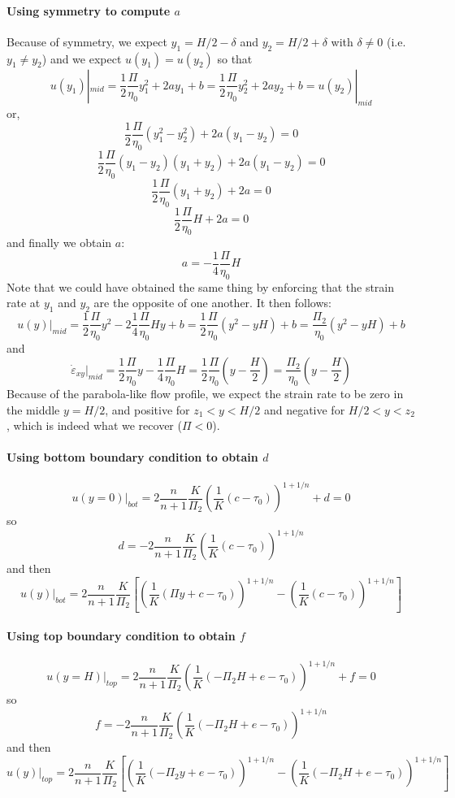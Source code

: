 \paragraph{Using symmetry to compute $a$}
Because of symmetry, we expect $y_1=H/2-\delta$ and $y_2=H/2+\delta$ with $\delta \neq 0$ 
(i.e. $y_1\neq y_2$) and we expect $u(y_1)=u(y_2)$ so that 
\[
u(y_1)|_{mid}=
\frac{1}{2}\frac{\Pi}{\eta_0} y_1^2 + 2a y_1 + b
=
\frac{1}{2}\frac{\Pi}{\eta_0} y_2^2 + 2a y_2 + b=
u(y_2)|_{mid}
\]
or, 
\[
\frac{1}{2}\frac{\Pi}{\eta_0} (y_1^2-y_2^2) + 2a (y_1-y_2) =0
\]
\[
\frac{1}{2}\frac{\Pi}{\eta_0} (y_1-y_2)(y_1+y_2) + 2a (y_1-y_2) =0
\]
\[
\frac{1}{2}\frac{\Pi}{\eta_0} (y_1+y_2) + 2a =0
\]
\[
\frac{1}{2}\frac{\Pi}{\eta_0} H + 2a =0
\]
and finally we obtain $a$:
\[
\boxed{
a = -\frac{1}{4} \frac{\Pi}{\eta_0} H
}
\]
Note that we could have obtained the same thing by enforcing that the strain rate 
at $y_1$ and $y_2$ are the opposite of one another. It then follows: 
\[
\boxed{
u(y)|_{mid} 
= \frac{1}{2}\frac{\Pi}{\eta_0} y^2  -2\frac{1}{4} \frac{\Pi}{\eta_0} H y + b
= \frac{1}{2}\frac{\Pi}{\eta_0} (y^2  -  y H) + b
= \frac{\Pi_2}{\eta_0} (y^2  -  y H) + b
}
\]
and 
\[
\boxed{
\dot{\varepsilon}_{xy}|_{mid}
= \frac{1}{2} \frac{\Pi}{\eta_0}y  -\frac{1}{4} \frac{\Pi}{\eta_0} H
= \frac{1}{2} \frac{\Pi}{\eta_0} (y  -\frac{H}{2} )
=  \frac{\Pi_2}{\eta_0} (y  -\frac{H}{2} )
}
\]
Because of the parabola-like flow profile, we expect the strain rate 
to be zero in the middle $y=H/2$, and positive for $z_1<y<H/2$ and 
negative for $H/2<y<z_2$, which is indeed what we recover ($\Pi<0$).

\paragraph{Using bottom boundary condition to obtain $d$}
\[
u(y=0)|_{bot} = 2 \frac{n}{n+1} \frac{K}{\Pi_2} \left( \frac{1}{K} ( c -\tau_0 ) \right)^{1+1/n} + d = 0
\]
so 
\[
d = -2 \frac{n}{n+1} \frac{K}{\Pi_2} \left( \frac{1}{K} ( c -\tau_0 ) \right)^{1+1/n} 
\]
and then
\[
\boxed{
u(y)|_{bot} = 
2 \frac{n}{n+1} \frac{K}{\Pi_2} \left[ \left( \frac{1}{K} ( \Pi y +c -\tau_0 ) \right)^{1+1/n} 
- \left( \frac{1}{K} ( c -\tau_0 ) \right)^{1+1/n} \right]
}
\]


\paragraph{Using top boundary condition to obtain $f$}
\[
u(y=H)|_{top} = 2 \frac{n}{n+1} \frac{K}{\Pi_2} \left( \frac{1}{K} ( -\Pi_2 H +e -\tau_0 ) \right)^{1+1/n} + f =0
\]
so 
\[
f= -2 \frac{n}{n+1} \frac{K}{\Pi_2} \left( \frac{1}{K} ( -\Pi_2 H +e -\tau_0 ) \right)^{1+1/n} 
\]
and then
\[
\boxed{
u(y)|_{top} = 2 \frac{n}{n+1} \frac{K}{\Pi_2}
\left[
\left( \frac{1}{K} ( -\Pi_2 y +e -\tau_0 ) \right)^{1+1/n} - 
\left( \frac{1}{K} ( -\Pi_2 H +e -\tau_0 ) \right)^{1+1/n} \right]
}
\]



